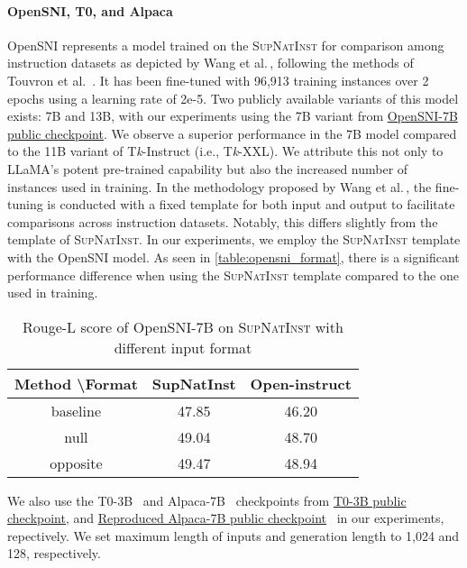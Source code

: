 \paragraph{OpenSNI, T0, and Alpaca}
OpenSNI represents a model trained on the \textsc{SupNatInst} for comparison among instruction datasets as depicted by Wang et al.\,\citep{tulu}, following the methods of Touvron et al. \,\citep{llama}. It has been fine-tuned with 96,913 training instances over 2 epochs using a learning rate of 2e-5. Two publicly available variants of this model exists: 7B and 13B, with our experiments using the 7B variant from \href{https://huggingface.co/allenai/open-instruct-sni-7b}{OpenSNI-7B public checkpoint}. We observe a superior performance in the 7B model compared to the 11B variant of T\textit{k}-Instruct (i.e., T\textit{k}-XXL). We attribute this not only to LLaMA's potent pre-trained capability but also the increased number of instances used in training. In the methodology proposed by Wang et al.\,\citep{tulu}, the fine-tuning is conducted with a fixed template for both input and output to facilitate comparisons across instruction datasets. Notably, this differs slightly from the template of \textsc{SupNatInst}. In our experiments, we employ the \textsc{SupNatInst} template with the OpenSNI model. As seen in \autoref{table:opensni_format}, there is a significant performance difference when using the \textsc{SupNatInst} template compared to the one used in training.
\begin{table}[h]
\centering
\caption{Rouge-L score of OpenSNI-7B on \textsc{SupNatInst} with different input format}
\label{table:opensni_format}
\begin{tabular}{c|c|c}
\toprule
Method \textbackslash Format & SupNatInst & Open-instruct \\
\midrule
baseline & 47.85 & 46.20 \\
null & 49.04 & 48.70 \\
opposite & 49.47 & 48.94 \\
\bottomrule
\end{tabular}
\end{table}

We also use the T0-3B \,\citep{t0} and Alpaca-7B \,\citep{alpaca} checkpoints from \href{https://huggingface.co/bigscience/T0_3B}{T0-3B public checkpoint}, and \href{https://huggingface.co/WeOpenML/Alpaca-7B-v1}{Reproduced Alpaca-7B public checkpoint} \,\citep{pandalm} in our experiments, repectively. We set maximum length of inputs and generation length to 1,024 and 128, respectively.

